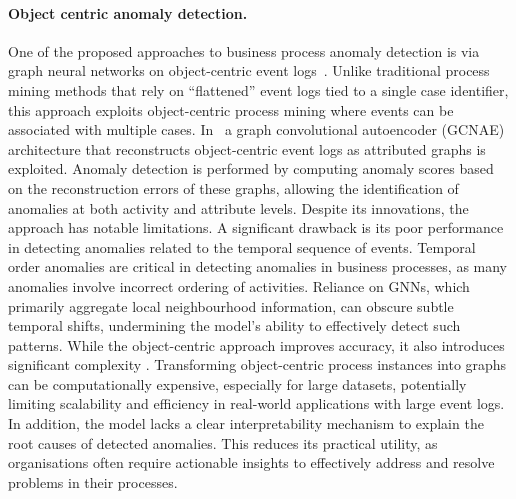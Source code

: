 \paragraph{Object centric anomaly detection.}
One of the proposed approaches to business process anomaly detection is via graph neural networks on object-centric event logs~\cite{b2}. Unlike traditional process mining methods that rely on ``flattened'' event logs tied to a single case identifier, this approach exploits object-centric process mining where events can be associated with multiple cases. In~\cite{b2}  a graph convolutional autoencoder (GCNAE) architecture that reconstructs object-centric event logs as attributed graphs is exploited. Anomaly detection is performed by computing anomaly scores based on the reconstruction errors of these graphs, allowing the identification of anomalies at both activity and attribute levels.
%
Despite its innovations, the approach has notable limitations. A significant drawback is its poor performance in detecting anomalies related to the temporal sequence of events. Temporal order anomalies are critical in detecting anomalies in business processes, as many anomalies involve incorrect ordering of activities. Reliance on GNNs, which primarily aggregate local neighbourhood information, can obscure subtle temporal shifts, undermining the model's ability to effectively detect such patterns.
%
While the object-centric approach improves accuracy, it also introduces significant complexity \cite{object_centric_anomaly_detection_challenge}. Transforming object-centric process instances into graphs can be computationally expensive, especially for large datasets, potentially limiting scalability and efficiency in real-world applications with large event logs.
%
In addition, the model lacks a clear interpretability mechanism to explain the root causes of detected anomalies. This reduces its practical utility, as organisations often require actionable insights to effectively address and resolve problems in their processes.



